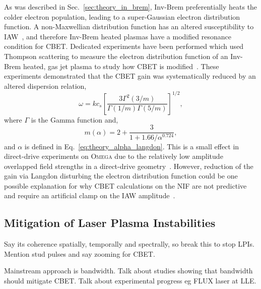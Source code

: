 As was described in Sec.~\ref{sec:theory_in_brem}, \ac{Inv-Brem} preferentially heats the colder electron population, leading to a super-Gaussian electron distribution function.
A non-Maxwellian distribution function has an altered susceptibility to \ac{IAW}~\cite{afeyan_kinetic_1998}, and therefore \ac{Inv-Brem} heated plasmas have a modified resonance condition for \ac{CBET}.
Dedicated experiments have been performed which used Thompson scattering to measure the electron distribution function of an \ac{Inv-Brem} heated, gas jet plasma to study how \ac{CBET} is modified~\cite{turnbull_impact_2020}.
These experiments demonstrated that the \ac{CBET} gain was systematically reduced by an altered dispersion relation,
\begin{equation}
    \omega = k c_s \left[ \frac{3 \Gamma^2(3/m)}{\Gamma(1/m)\Gamma(5/m)} \right]^{1/2},
\end{equation}
where $\Gamma$ is the Gamma function and,
\begin{equation}
    m(\alpha) = 2 + \frac{3}{1 + 1.66/\alpha^{0.724}},
\end{equation}
and $\alpha$ is defined in Eq.~\ref{eq:theory_alpha_langdon}.
This is a small effect in direct-drive experiments on \textsc{Omega} due to the relatively low amplitude overlapped field strengths in a direct-drive geometry~\cite{colaitis_inverse_2021}.
However, reduction of the gain via Langdon disturbing the electron distribution function could be one possible explanation for why \ac{CBET} calculations on the \ac{NIF} are not predictive and require an artificial clamp on the \ac{IAW} amplitude~\cite{michel_stochastic_2012,kritcher_energy_2018}.

\subsection{Mitigation of Laser Plasma Instabilities}%
\label{sec:theory_lpi_mitigation}

Say its coherence spatially, temporally and spectrally, so break this to stop LPIs.
Mention stud pulses and say zooming for CBET.

Mainstream approach is bandwidth.
Talk about studies showing that bandwidth should mitigate CBET.
Talk about experimental progress eg FLUX laser at LLE.
